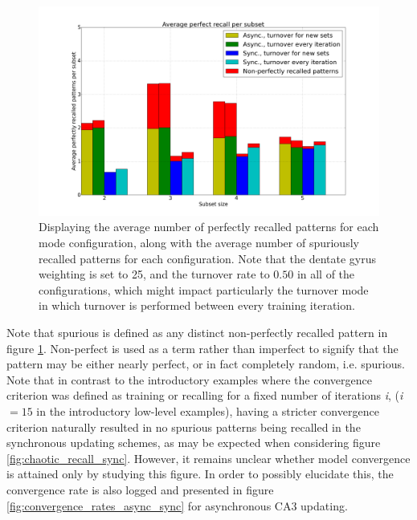 \begin{figure}
    \centering
    \includegraphics[width=14cm]{fig/average_perfect_recall_rates_by_set_size_with_spurious_bars}
    \caption{Displaying the average number of perfectly recalled patterns for each mode configuration, along with the average number of spuriously recalled patterns for each configuration. Note that the dentate gyrus weighting is set to 25, and the turnover rate to $0.50$ in all of the configurations, which might impact particularly the turnover mode in which turnover is performed between every training iteration.}
    \label{fig:avg_perfect_recall_rates_with_spurious_bars}
\end{figure}

Note that spurious is defined as any distinct non-perfectly recalled pattern in figure \ref{fig:avg_perfect_recall_rates_with_spurious_bars}. Non-perfect is used as a term rather than imperfect to signify that the pattern may be either nearly perfect, or in fact completely random, i.e. spurious. Note that in contrast to the introductory examples where the convergence criterion was defined as training or recalling for a fixed number of iterations \textit{i}, (\textit{i} $=15$ in the introductory low-level examples), having a stricter convergence criterion naturally resulted in no spurious patterns being recalled in the synchronous updating schemes, as may be expected when considering figure \ref{fig:chaotic_recall_sync}. However, it remains unclear whether model convergence is attained only by studying this figure. In order to possibly elucidate this, the convergence rate is also logged and presented in figure \ref{fig:convergence_rates_async_sync} for asynchronous CA3 updating.

